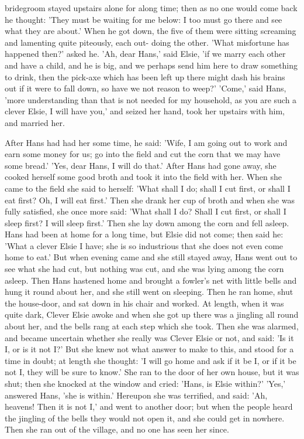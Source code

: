 \documentclass[12pt]{book}
\begin{document}
bridegroom stayed upstairs alone for along time; then as no one would
come back he thought: 'They must be waiting for me below: I too must
go there and see what they are about.' When he got down, the five of
them were sitting screaming and lamenting quite piteously, each out-
doing the other. 'What misfortune has happened then?' asked he. 'Ah,
dear Hans,' said Elsie, 'if we marry each other and have a child, and
he is big, and we perhaps send him here to draw something to drink,
then the pick-axe which has been left up there might dash his brains
out if it were to fall down, so have we not reason to weep?' 'Come,'
said Hans, 'more understanding than that is not needed for my
household, as you are such a clever Elsie, I will have you,' and
seized her hand, took her upstairs with him, and married her.

After Hans had had her some time, he said: 'Wife, I am going out to
work and earn some money for us; go into the field and cut the corn
that we may have some bread.' 'Yes, dear Hans, I will do that.' After
Hans had gone away, she cooked herself some good broth and took it
into the field with her. When she came to the field she said to
herself: 'What shall I do; shall I cut first, or shall I eat first?
Oh, I will eat first.' Then she drank her cup of broth and when she
was fully satisfied, she once more said: 'What shall I do? Shall I cut
first, or shall I sleep first? I will sleep first.' Then she lay down
among the corn and fell asleep. Hans had been at home for a long time,
but Elsie did not come; then said he: 'What a clever Elsie I have; she
is so industrious that she does not even come home to eat.' But when
evening came and she still stayed away, Hans went out to see what she
had cut, but nothing was cut, and she was lying among the corn asleep.
Then Hans hastened home and brought a fowler's net with little bells
and hung it round about her, and she still went on sleeping. Then he
ran home, shut the house-door, and sat down in his chair and worked.
At length, when it was quite dark, Clever Elsie awoke and when she got
up there was a jingling all round about her, and the bells rang at
each step which she took. Then she was alarmed, and became uncertain
whether she really was Clever Elsie or not, and said: 'Is it I, or is
it not I?' But she knew not what answer to make to this, and stood for
a time in doubt; at length she thought: 'I will go home and ask if it
be I, or if it be not I, they will be sure to know.' She ran to the
door of her own house, but it was shut; then she knocked at the window
and cried: 'Hans, is Elsie within?' 'Yes,' answered Hans, 'she is
within.' Hereupon she was terrified, and said: 'Ah, heavens! Then it
is not I,' and went to another door; but when the people heard the
jingling of the bells they would not open it, and she could get in
nowhere. Then she ran out of the village, and no one has seen her
since.
\end{document}
